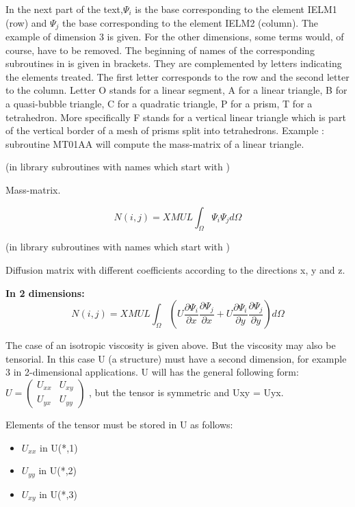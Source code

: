In the next part of the text,$\Psi _{i} $ is the base corresponding to the
element IELM1 (row) and $\Psi _{j} $ the base corresponding to the element
IELM2 (column). The example of dimension 3 is given. For the other dimensions,
some terms would, of course, have to be removed. The beginning of names of the
corresponding subroutines in \bief is given in brackets. They are complemented
by letters indicating the elements treated. The first letter corresponds to the
row and the second letter to the column. Letter O stands for a linear segment,
A for a linear triangle, B for a quasi-bubble triangle, C for a quadratic
triangle, P for a prism, T for a tetrahedron. More specifically F stands for a
vertical linear triangle which is part of the vertical border of a mesh of
prisms split into tetrahedrons. Example : subroutine MT01AA will compute the
mass-matrix of a linear triangle.


(in library \bief subroutines with names which start with )

Mass-matrix.

\[N(i,j)=XMUL \int _{\Omega }\Psi _{i} \Psi _{j} d\Omega  \]


(in library \bief subroutines with names which start with )

Diffusion matrix with different coefficients according to the directions x, y
and z.

\textbf{In 2 dimensions:}
\[N(i,j)=XMUL \int _{\Omega }
(U\frac{\partial \Psi _{i} }{\partial x}
  \frac{\partial \Psi _{j} }{\partial x}
 +U\frac{\partial \Psi _{i} }{\partial y}
   \frac{\partial \Psi _{j} }{\partial y} )d\Omega  \]

The case of an isotropic viscosity is given above. But the viscosity may also
be tensorial. In this case U (a structure) must have a second
dimension, for example 3 in 2-dimensional applications. U will has the general
following form:
$U=\left(\begin{array}{cc}
    {U_{xx} } & {U_{xy} } \\
    {U_{yx} } & {U_{yy} }
\end{array}\right)$
, but the tensor is symmetric and Uxy = Uyx.

Elements of the tensor must be stored in U as follows:
\begin{itemize}
  \item $U_{xx}$ in U(*,1)
  \item $U_{yy}$ in U(*,2)
  \item $U_{xy}$ in U(*,3)
\end{itemize}

